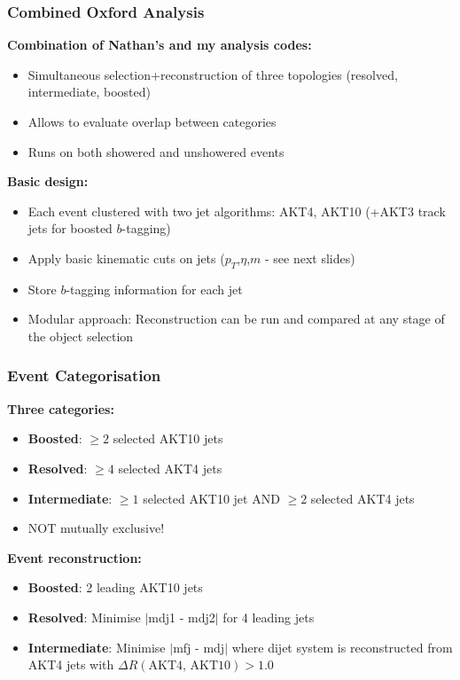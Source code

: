 \begin{frame}\frametitle{Combined Oxford Analysis}
\begin{footnotesize}
\textbf{Combination of Nathan's and my analysis codes:}
\begin{itemize}
 \item Simultaneous selection+reconstruction of three topologies (resolved, intermediate, boosted)
 \item Allows to evaluate overlap between categories
 \item Runs on both showered and unshowered events
\end{itemize}
\vspace{0.5cm}
\textbf{Basic design:}
\begin{itemize}
 \item Each event clustered with two jet algorithms: AKT4, AKT10 (+AKT3 track jets for boosted $b$-tagging)
 \item Apply basic kinematic cuts on jets ($p_T$,$\eta$,$m$ - see next slides)
 \item Store $b$-tagging information for each jet
 \item Modular approach: Reconstruction can be run and compared at any stage of the object selection
\end{itemize}
\end{footnotesize}
\end{frame}

\begin{frame}\frametitle{Event Categorisation}
\begin{footnotesize}
\textbf{Three categories:}
\begin{itemize}
 \item \textbf{Boosted}: $\geq 2$ selected AKT10 jets
 \item \textbf{Resolved}: $\geq 4$ selected AKT4 jets
 \item \textbf{Intermediate}: $\geq 1$ selected AKT10 jet AND $\geq 2$ selected AKT4 jets
 \item NOT mutually exclusive!
\end{itemize}
\vspace{0.5cm}
\textbf{Event reconstruction:}
\begin{itemize}
 \item \textbf{Boosted}: 2 leading AKT10 jets
 \item \textbf{Resolved}: Minimise $|$mdj1 - mdj2$|$ for 4 leading jets
 \item \textbf{Intermediate}: Minimise $|$mfj - mdj$|$ where dijet system is reconstructed from AKT4 jets with $\Delta R(\textrm{AKT4, AKT10}) > 1.0$
\end{itemize}
\end{footnotesize}
\end{frame}



